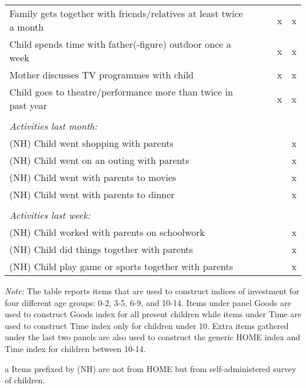 {\begin{threeparttable}
\begin{tabularx}{.97\linewidth}{|l| *{4}{Y|}}
		\hspace{3mm} Family gets together with friends/relatives at least twice a month & & & x & x \\
		\hspace{3mm} Child spends time with father(-figure) outdoor once a week & & & x & x \\
		\hspace{3mm} Mother discusses TV programmes with child & & & x & x \\
		\hspace{3mm} Child goes to theatre/performance more than twice in past year & & & x & x \\
		& & & & \\
		\textit{Activities last month:} & & & & \\
		\hspace{3mm} (NH) Child went shopping with parents & & & & x \\
		\hspace{3mm} (NH) Child went on an outing with parents & & & & x \\
		\hspace{3mm} (NH) Child went with parents to movies & & & & x \\
		\hspace{3mm} (NH) Child went with parents to dinner& & & & x \\
		& & & & \\
		\textit{Activities last week:} & & & & \\
		\hspace{3mm} (NH) Child worked with parents on schoolwork & & & & x  \\
		\hspace{3mm} (NH) Child did things together with parents & & & & x  \\	
		\hspace{3mm} (NH) Child play game or sports together with parents & & & & x  \\
		\hline			
	\end{tabularx}
	\begin{tablenotes}[flushleft]\footnotesize
		\item \textit{Note: }The table reports items that are used to construct indices of investment for four different age groups: 0-2, 3-5, 6-9, and 10-14. Items under panel Goods are used to construct Goods index for all present children while items under Time are used to construct Time index only for children under 10. Extra items gathered under the last two panels are also used to construct the generic HOME index and Time index for children between 10-14.
		\item[a] Items prefixed by (NH) are not from HOME but from self-administered survey of children.
	\end{tablenotes}
\end{threeparttable}
}